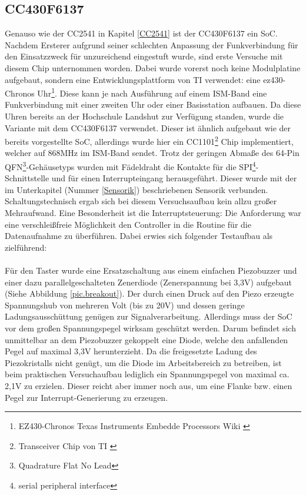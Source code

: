 \documentclass[12pt]{scrreprt} %
\begin{document}
\subsection{CC430F6137}
Genauso wie der CC2541 in Kapitel \vref{CC2541} ist der CC430F6137 ein SoC. Nachdem Ersterer aufgrund seiner schlechten Anpassung der Funkverbindung für den Einsatzzweck für unzureichend eingestuft wurde, sind erste Versuche mit diesem Chip unternommen worden. Dabei wurde vorerst noch keine Modulplatine aufgebaut, sondern eine Entwicklungsplattform von TI verwendet: eine ez430-Chronos Uhr\footnote{EZ430-Chronos Texas Instruments Embedde Processors Wiki \citep{EZ430}}. Diese kann je nach Ausführung auf einem ISM-Band eine Funkverbindung mit einer zweiten Uhr oder einer Basisstation aufbauen. Da diese Uhren bereits an der Hochschule Landshut zur Verfügung standen, wurde die Variante mit dem CC430F6137 verwendet.  Dieser ist ähnlich aufgebaut wie der bereits vorgestellte SoC, allerdings wurde hier ein CC1101\footnote{Transceiver Chip von TI \citep{CC1101}} Chip implementiert, welcher auf 868MHz im ISM-Band sendet. Trotz der geringen Abmaße des 64-Pin QFN\footnote{Quadrature Flat No Lead}-Gehäusetyps wurden mit Fädeldraht die Kontakte für die SPI\footnote{serial peripheral interface}-Schnittstelle und für einen Interrupteingang herausgeführt. Dieser wurde mit der im Unterkapitel (Nummer \vref{Sensorik}) beschriebenen Sensorik verbunden. Schaltungstechnisch ergab sich bei diesem Versuchsaufbau kein allzu großer Mehraufwand. Eine Besonderheit ist die Interruptsteuerung: Die Anforderung war eine verschleißfreie Möglichkeit den Controller in die Routine für die Datenaufnahme zu überführen. Dabei erwies sich folgender Testaufbau als zielführend:\\
\\
Für den Taster wurde eine Ersatzschaltung aus einem einfachen Piezobuzzer und einer dazu parallelgeschalteten Zenerdiode (Zenerspannung bei 3,3V) aufgebaut (Siehe Abbildung \vref{pic.breakout}). Der durch einen Druck auf den Piezo erzeugte Spannungshub von mehreren Volt (bis zu 20V) und dessen geringe Ladungsausschüttung genügen zur Signalverarbeitung. Allerdings muss der SoC vor dem großen Spannungspegel wirksam geschützt werden. Darum befindet sich unmittelbar an dem Piezobuzzer gekoppelt eine Diode, welche den anfallenden Pegel auf maximal 3,3V herunterzieht. Da die freigesetzte Ladung des Piezokristalls nicht genügt, um die Diode im Arbeitsbereich zu betreiben, ist beim praktischen Versuchaufbau lediglich ein Spannungspegel von maximal ca. 2,1V zu erzielen. Dieser reicht aber immer noch aus, um eine Flanke bzw. einen Pegel zur Interrupt-Generierung zu erzeugen. 
\end{document}
